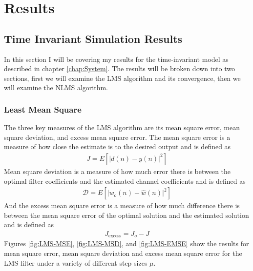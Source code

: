\chapter{Results}
\label{chap:Results}
\section{Time Invariant Simulation Results}
In this section I will be covering my results for the time-invariant %
model as described in chapter \ref{chap:System}. The results will be %
broken down into two sections, first we will examine the %
LMS algorithm and its convergence, then we will examine the NLMS %
algorithm.

\subsection{Least Mean Square}
\FloatBarrier
The three key measures of the LMS algorithm are its mean square %
error, mean square deviation, and excess mean square error. %
The mean square error is a measure of how close the estimate %
is to the desired output and is defined as 
\begin{align}
	J = E\left[ \lvert d(n) - y(n) \rvert^{2} \right]
\end{align}
Mean square deviation is a measure of how much error there is %
between the optimal filter coefficients and the estimated %
channel coefficients and is defined as
\begin{align}
	\mathscr{D} = E\left[ \lvert w_{o}(n) - \hat{w}(n) \rvert^{2} \right]
\end{align}
And the excess mean square error is a measure of how much %
difference there is between the mean square error of the %
optimal solution and the estimated solution and is defined as
\begin{align}
	J_{\text{excess}} = J_{o} - J
\end{align}
Figures \ref{fig:LMS-MSE}, \ref{fig:LMS-MSD}, and \ref{fig:LMS-EMSE} %
show the results for mean square error, mean square deviation and %
excess mean square error for the LMS filter under a variety of %
different step sizes $\mu$.

